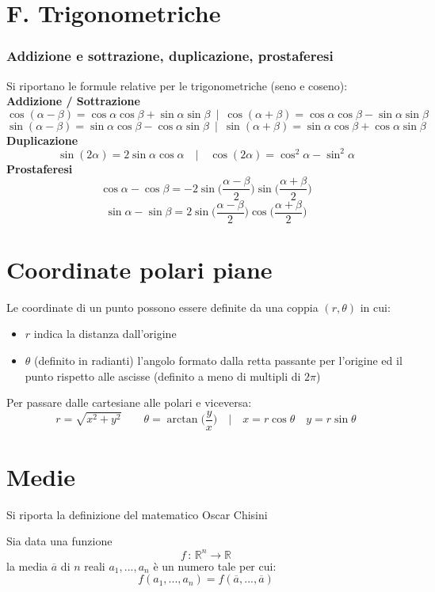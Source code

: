 \documentclass[10pt, oneside]{book}
\theoremstyle{plain}
\begin{document}
\section{F. Trigonometriche}
\subsubsection{Addizione e sottrazione, duplicazione, prostaferesi}
Si riportano le formule relative per le trigonometriche (seno e coseno):
\textbf{Addizione / Sottrazione}
\[\cos(\alpha - \beta) = \cos \alpha \cos \beta + \sin \alpha \sin \beta \enspace | \enspace \cos(\alpha + \beta) = \cos \alpha \cos \beta - \sin \alpha \sin \beta\]
\[\sin(\alpha - \beta) = \sin \alpha \cos \beta - \cos \alpha \sin \beta \enspace | \enspace \sin(\alpha + \beta) = \sin \alpha \cos \beta + \cos \alpha \sin \beta\]
\textbf{Duplicazione}
\[\sin (2\alpha) = 2 \sin \alpha \cos \alpha \quad \bigg| \quad \cos (2\alpha) = \cos^2\alpha - \sin^2 \alpha\]
\textbf{Prostaferesi}
\[\cos \alpha - \cos \beta = -2 \sin \big(\frac{\alpha - \beta}{2}\big)\sin\big(\frac{\alpha + \beta}{2}\big)\]
\[\sin \alpha - \sin \beta = 2 \sin \big(\frac{\alpha - \beta}{2}\big)\cos\big(\frac{\alpha + \beta}{2}\big)\]

\section{Coordinate polari piane}
Le coordinate di un punto possono essere definite da una coppia $(r, \theta)$ in cui:
\begin{itemize}
    \item $r$ indica la distanza dall'origine
    \item $\theta$ (definito in radianti) l'angolo formato dalla retta passante per l'origine ed il punto rispetto alle ascisse (definito a meno di multipli di $2\pi$)
\end{itemize}
Per passare dalle cartesiane alle polari e viceversa:
\[r = \sqrt{x^2 + y^2} \qquad \theta = \arctan\bigg( \frac{y}{x} \bigg) \quad \bigg| \quad x = r \cos \theta \quad y = r \sin \theta\]

\section{Medie}
Si riporta la definizione del matematico Oscar Chisini
\begin{defin}
Sia data una funzione
\[f \, : \, \mathbb{R}^n \longrightarrow \mathbb{R}\]
la media $\overline{a}$ di $n$ reali $a_1, ..., a_n$ è un numero tale per cui:
\[f(a_1, ..., a_n) = f(\overline{a}, ..., \overline{a})\]
\end{defin}
\end{document}
